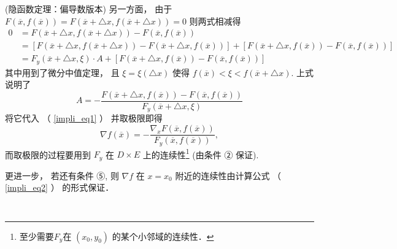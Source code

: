 \begin{theorem}{(隐函数定理：偏导数版本)}
另一方面， 由于 $F(\overline{x},f(\overline{x}))=F(\overline{x}+\triangle x,f(\overline{x}+\triangle x))=0$
则两式相减得
\begin{equation}
\begin{aligned}
0 & = F(\overline{x}+\triangle x,f(\overline{x}+\triangle x))-F(\overline{x},f(\overline{x}))\\
 & = \left[F(\overline{x}+\triangle x,f(\overline{x}+\triangle x))-F(\overline{x}+\triangle x,f(\overline{x}))\right]+\left[F(\overline{x}+\triangle x,f(\overline{x}))-F(\overline{x},f(\overline{x}))\right]\\
 & = F_{y}(\overline{x}+\triangle x,\xi)\cdot A+\left[F(\overline{x}+\triangle x,f(\overline{x}))-F(\overline{x},f(\overline{x}))\right]
\end{aligned}
\end{equation}
其中用到了微分中值定理， 且 $\xi=\xi(\triangle x)$ 使得 $f(\overline{x})<\xi<f(\overline{x}+\triangle x)$.
上式说明了 
\[
A=-{\displaystyle \frac{F(\overline{x}+\triangle x,f(\overline{x}))-F(\overline{x},f(\overline{x}))}{F_{y}(\overline{x}+\triangle x,\xi)}}
\]
将它代入 （ \autoref{impli_eq1} ） 并取极限即得 
\begin{equation}\label{impli_eq2}
\nabla f(\overline{x})=-{\displaystyle \frac{\nabla_{x}F(\overline{x},f(\overline{x}))}{F_{y}(\overline{x},f(\overline{x}))},}
\end{equation}
而取极限的过程要用到 $F_{y}$ 在 $D\times E$ 上的连续性\footnote{至少需要$F_y$在 $(x_0,y_0)$ 的某个小邻域的连续性．} (由条件 ② 保证). 

更进一步， 若还有条件 ⑤, 则 $\nabla f$ 在 $x=x_{0}$ 附近的连续性由计算公式 （ \autoref{impli_eq2} ） 的形式保证． 
 \end{theorem}

\verb| |

